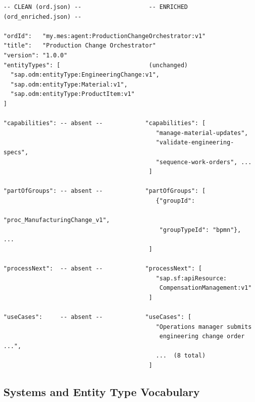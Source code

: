 \begin{lstlisting}[float=!t, floatplacement=!t, basicstyle=\ttfamily\scriptsize, breaklines=true, frame=single, label={lst:ord-example},
  caption={Example resource in Clean-ORD and Enriched-ORD state. Fields absent in the clean state are marked \texttt{-- absent --}; the four added fields are written back from the design-time process-matching flow after validation.}]
-- CLEAN (ord.json) --                   -- ENRICHED (ord_enriched.json) --

"ordId":   "my.mes:agent:ProductionChangeOrchestrator:v1"
"title":   "Production Change Orchestrator"
"version": "1.0.0"
"entityTypes": [                         (unchanged)
  "sap.odm:entityType:EngineeringChange:v1",
  "sap.odm:entityType:Material:v1",
  "sap.odm:entityType:ProductItem:v1"
]

"capabilities": -- absent --            "capabilities": [
                                           "manage-material-updates",
                                           "validate-engineering-specs",
                                           "sequence-work-orders", ...
                                         ]

"partOfGroups": -- absent --            "partOfGroups": [
                                           {"groupId":
                                            "proc_ManufacturingChange_v1",
                                            "groupTypeId": "bpmn"}, ...
                                         ]

"processNext":  -- absent --            "processNext": [
                                           "sap.sf:apiResource:
                                            CompensationManagement:v1"
                                         ]

"useCases":     -- absent --            "useCases": [
                                           "Operations manager submits
                                            engineering change order ...",
                                           ...  (8 total)
                                         ]
\end{lstlisting}

\subsection{Systems and Entity Type Vocabulary}
\label{appendix:landscape-systems}

